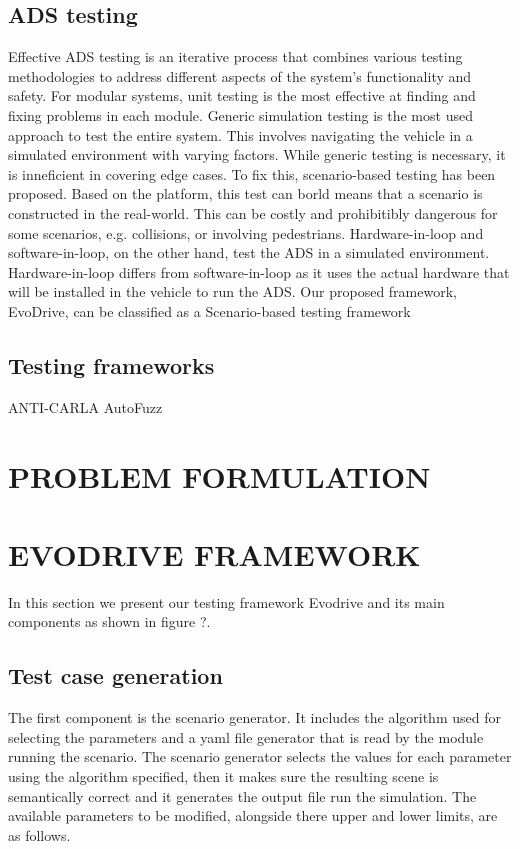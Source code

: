 \documentclass[a4paper, 10pt, conference]{ieeeconf}
\begin{document}
\subsection{ADS testing}
Effective ADS testing is an iterative process that combines various testing methodologies to address different aspects of the system's functionality and safety. For modular systems, unit testing is the most effective at finding and fixing problems in each module. Generic simulation testing is the most used approach to test the entire system. This involves navigating the vehicle in a simulated environment with varying factors. While generic testing is necessary, it is inneficient in covering edge cases. To fix this, scenario-based testing has been proposed. Based on the platform, this test can borld means that a scenario is constructed in the real-world. This can be costly and prohibitibly dangerous for some scenarios, e.g. collisions, or involving pedestrians. Hardware-in-loop and software-in-loop, on the other hand, test the ADS in a simulated environment. Hardware-in-loop differs from software-in-loop as it uses the actual hardware that will be installed in the vehicle to run the ADS.
Our proposed framework, EvoDrive, can be classified as a Scenario-based testing framework

\subsection{Testing frameworks}
ANTI-CARLA
AutoFuzz



\section{PROBLEM FORMULATION}

\section{EVODRIVE FRAMEWORK}
In this section we present our testing framework Evodrive and its main components as shown in figure ?.

\subsection{Test case generation}
The first component is the scenario generator. It includes the algorithm used for selecting the parameters and a yaml file generator that is read by the module running the scenario. The scenario generator selects the values for each parameter using the algorithm specified, then it makes sure the resulting scene is semantically correct and it generates the output file run the simulation. The available parameters to be modified, alongside there upper and lower limits, are as follows.
\end{document}
